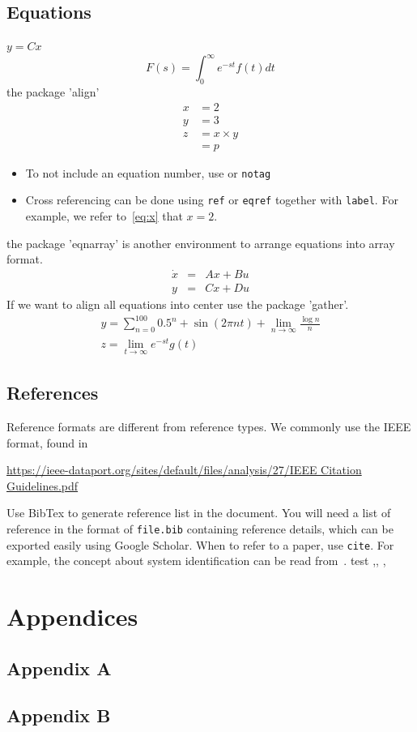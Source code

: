 \documentclass[11pt,a4paper]{article}
\begin{document}
\subsection{Equations}
$y=Cx$
\begin{equation}
	F(s) = \int_0^\infty e^{-st} f(t) dt
\end{equation}
the package 'align'
\begin{align}
    x    &= 2 \label{eq:x} \\
    y    &= 3 \label{eq:y} \\
    z    &= x \times y \nonumber \\
        &= p \label{eq:results}
\end{align}
\begin{itemize}
\item To not include an equation number, use \texttt{\nonumber} or \texttt{notag} 
\item Cross referencing can be done using \texttt{ref} or \texttt{eqref} together with \texttt{label}. For example, we refer to~\eqref{eq:x} that $x=2$.
\end{itemize}
the package 'eqnarray' is another environment to arrange equations into array format.
\begin{eqnarray}
\dot{x} &=& Ax + Bu \\
y &=& Cx+Du
\end{eqnarray}
If we want to align all equations into center use the package 'gather'.
\begin{gather}
y = \sum_{n=0}^100 0.5^n + \sin(2\pi n t) + \lim_{n \rightarrow \infty} \frac{\log n}{n} \\
z = \lim_{t \rightarrow \infty} e^{-st} g(t) 
\end{gather}

\subsection{References}
Reference formats are different from reference types. We commonly use the IEEE format, found in 

\url{https://ieee-dataport.org/sites/default/files/analysis/27/IEEE Citation Guidelines.pdf}

Use BibTex to generate reference list in the document. You will need a list of reference in the format of \texttt{file.bib} containing reference details, which can be exported easily using Google Scholar. When to refer to a paper, use \texttt{cite}. For example, the concept about system identification can be read from~\cite{SoS:89}. test \cite{CPM:89},\citep{CaA:15}, \cite{GrB:08b},\citep{JiY:09}




\section{Appendices}

\subsection{Appendix A}

\subsection{Appendix B}
\end{document}
